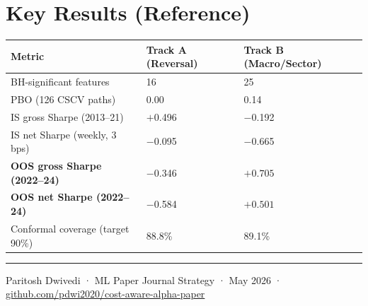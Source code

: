 \documentclass[11pt,a4paper]{article}
\begin{document}
\section*{Key Results (Reference)}

\begin{tabularx}{\linewidth}{Xll}
\toprule
\textbf{Metric} & \textbf{Track A (Reversal)} & \textbf{Track B (Macro/Sector)}\\
\midrule
BH-significant features                 & 16      & 25\\
PBO (126 CSCV paths)                    & 0.00    & 0.14\\
IS gross Sharpe (2013--21)              & $+$0.496 & $-$0.192\\
IS net Sharpe (weekly, 3\,bps)          & $-$0.095 & $-$0.665\\
\textbf{OOS gross Sharpe (2022--24)}    & $-$0.346 & $\mathbf{+0.705}$\\
\textbf{OOS net Sharpe (2022--24)}      & $-$0.584 & $\mathbf{+0.501}$\\
Conformal coverage (target 90\%)        & 88.8\%  & 89.1\%\\
\bottomrule
\end{tabularx}

\vspace{1.5em}
\hrule
\vspace{0.4em}
{\footnotesize\color{gray}
Paritosh Dwivedi · ML Paper Journal Strategy · May 2026 ·
\url{github.com/pdwi2020/cost-aware-alpha-paper}}
\end{document}
